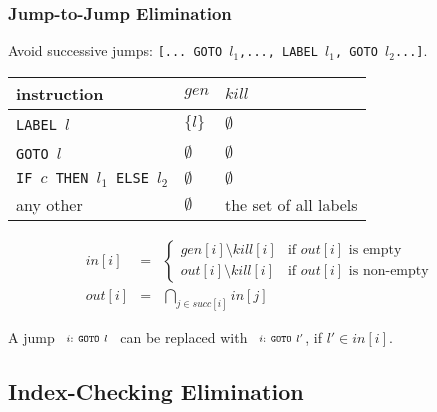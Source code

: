 \documentclass{beamer}
\begin{document}
\begin{frame}
\frametitle{Jump-to-Jump Elimination}

Avoid successive jumps: {\tt [... GOTO $l_1$,..., LABEL $l_1$, GOTO $l_2$...]}.

{\footnotesize
\begin{center}
\begin{tabular}{|l|l|l|}\hline
  instruction & $gen$ & $kill$ \\\hline
  {\tt LABEL}~$l$ & $\{l\}$ & $\emptyset$ \\\hline
  {\tt GOTO}~$l$ & $\emptyset$ & $\emptyset$ \\\hline
  {\tt IF $c$ THEN $l_1$ ELSE $l_2$} & $\emptyset$ & $\emptyset$ \\\hline
  any other & $\emptyset$ & the set of all labels \\\hline
\end{tabular}
\end{center}

\begin{eqnarray}
in[i] & = & \left\{ {\begin{array}{ll}
                      gen[i]\setminus kill[i] & \mbox{if $out[i]$ is empty} \\
                      out[i]\setminus kill[i] & \mbox{if $out[i]$ is non-empty}
                     \end{array}}
            \right.
 \label{jump-in}\\
out[i] & = & \bigcap_{j \in succ[i]} in[j] \label{jump-out}
\end{eqnarray}
}

\vspace{1ex}
A jump ~$\scriptstyle{i:}~{\tt GOTO}~l$~ can be replaced with ~$\scriptstyle{i:}~{\tt GOTO}~l'$, if $l' \in in[i]$.

\end{frame}



\subsection{Index-Checking Elimination}

\begin{frame}[fragile]
    \tableofcontents[currentsubsection]
\end{frame}
\end{document}
